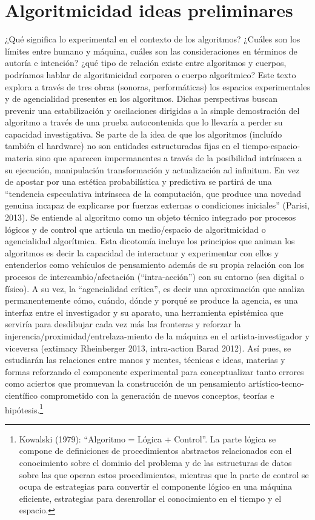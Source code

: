 \section{Algoritmicidad ideas preliminares}

¿Qué significa lo experimental en el contexto de los algoritmos? ¿Cuáles son los límites entre humano y máquina, cuáles son las consideraciones en términos de autoría e intención? ¿qué tipo de relación existe entre algoritmos y cuerpos, podríamos hablar de algoritmicidad corporea o cuerpo algorítmico? Este texto explora a través de tres obras (sonoras, performáticas) los espacios experimentales y de agencialidad presentes en los algoritmos. Dichas perspectivas buscan prevenir una estabilización y oscilaciones dirigidas a la simple demostración del algoritmo a través de una prueba autocontenida que lo llevaría a perder su capacidad investigativa. Se parte de la idea de que los algoritmos (incluído también el hardware) no son entidades estructuradas fijas en el tiempo-espacio-materia sino que aparecen impermanentes a través de la posibilidad intrínseca a su ejecución, manipulación transformación y actualización ad infinitum. En vez de apostar por una estética probabilística y predictiva se partirá de una “tendencia especulativa intrínseca de la computación, que produce una novedad genuina incapaz de explicarse por fuerzas externas o condiciones iniciales” (Parisi, 2013). Se entiende al algoritmo como un objeto técnico integrado por procesos lógicos y de control que articula un medio/espacio de algoritmicidad o agencialidad algorítmica. Esta dicotomía incluye los principios que animan los algoritmos es decir la capacidad de interactuar y experimentar con ellos y entenderlos como vehículos de pensamiento además de su propia relación con los procesos de intercambio/afectación (“intra-acción”) con su entorno (sea digital o físico). A su vez, la “agencialidad crítica”, es decir una aproximación que analiza permanentemente cómo, cuándo, dónde y porqué se produce la agencia, es una interfaz entre el investigador y su aparato, una herramienta epistémica que serviría para desdibujar cada vez más las fronteras y reforzar la injerencia/proximidad/entrelaza-miento de la máquina en el artista-investigador y viceversa (extimacy Rheinberger 2013, intra-action Barad 2012). Así pues, se estudiarán las relaciones entre manos y mentes, técnicas e ideas, materias y formas reforzando el componente experimental para conceptualizar tanto errores como aciertos que promuevan la construcción de un pensamiento artístico-tecno-científico comprometido con la generación de nuevos conceptos, teorías e hipótesis.\footnote{Kowalski (1979): “Algoritmo = Lógica + Control”. La parte lógica se compone de definiciones de procedimientos abstractos relacionados con el conocimiento sobre el dominio del problema y de las estructuras de datos sobre las que operan estos procedimientos, mientras que la parte de control se ocupa de estrategias para convertir el componente lógico en una máquina eficiente, estrategias para desenrollar el conocimiento en el tiempo y el espacio.}

